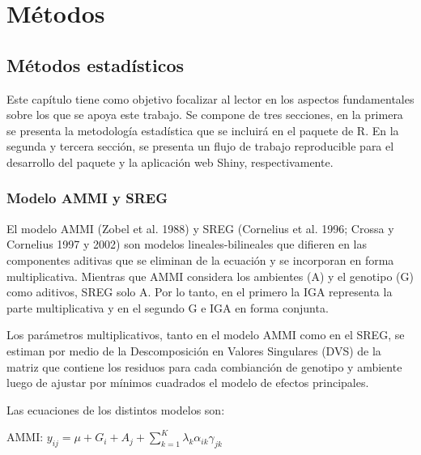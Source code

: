 
\chapter{Métodos}
\section{Métodos estadísticos}

Este capítulo tiene como objetivo focalizar al lector en los aspectos fundamentales sobre los que se apoya este trabajo. Se compone de tres secciones, en la primera se presenta la metodología estadística que se incluirá en el paquete de R.  En la segunda y tercera sección, se presenta un flujo de trabajo reproducible para el desarrollo del paquete y la aplicación web Shiny, respectivamente.



\subsection{Modelo AMMI y SREG}
El modelo AMMI (Zobel et al. 1988) y SREG (Cornelius et al. 1996; Crossa y Cornelius 1997 y 2002) son modelos lineales-bilineales que difieren en las componentes aditivas que se eliminan de la ecuación y se incorporan en forma multiplicativa. Mientras que AMMI considera los ambientes (A) y el genotipo (G) como aditivos, SREG solo A. Por lo tanto, en el primero la IGA representa la parte multiplicativa y en el segundo G e IGA en forma conjunta. 

Los parámetros multiplicativos, tanto en el modelo AMMI como en el SREG, se estiman por medio de la Descomposición en Valores Singulares (DVS) de la matriz que contiene los residuos para cada combianción de genotipo y ambiente luego de ajustar por mínimos cuadrados el modelo de efectos principales. 

Las ecuaciones de los distintos modelos son:

\hspace{0.5cm} AMMI: $y_{ij}= \mu + G_i + A_j + \sum_{k=1}^K \lambda_k \alpha_{ik} \gamma_{jk}$

